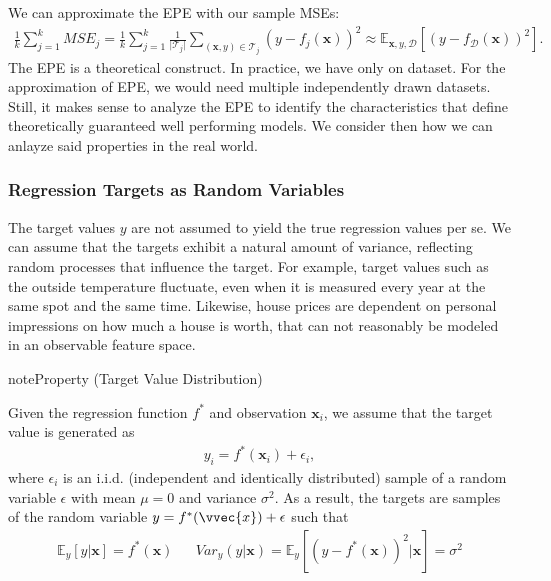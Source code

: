 \documentclass[letterpaper,10pt,english]{jupyterBook}
\begin{document}
\sphinxAtStartPar
We can approximate the EPE with our sample MSEs:
\begin{equation}\label{equation:regression_bias_var:eq:mse_approx}
\begin{split}\frac1k\sum_{j=1}^k MSE_j=\frac1k\sum_{j=1}^k\frac{1}{\lvert\mathcal{T}_j\rvert}\sum_{(\mathbf{x},y)\in\mathcal{T}_j}(y-f_j(\mathbf{x}))^2\approx\mathbb{E}_{\mathbf{x},y,\mathcal{D}}[(y-f_\mathcal{D}(\mathbf{x}))^2].\end{split}
\end{equation}
\sphinxAtStartPar
The EPE is a theoretical construct. In practice, we have only on dataset. For the approximation of EPE, we would need multiple independently drawn datasets. Still, it makes sense to analyze the EPE to identify the characteristics that define theoretically guaranteed well performing models. We consider then how we can anlayze said properties in the real world.


\subsubsection{Regression Targets as Random Variables}
\label{\detokenize{regression_bias_var:regression-targets-as-random-variables}}
\sphinxAtStartPar
The target values \(y\) are not assumed to yield the true regression values per se. We can assume that the targets exhibit a natural amount of variance, reflecting random processes that influence the target. For example, target values such as the outside temperature fluctuate, even when it is measured every year at the same spot and the same time. Likewise, house prices are dependent on personal impressions on how much a house is worth, that can not reasonably be modeled in an observable feature space.
\label{None:prop:target_distr}
\begin{sphinxadmonition}{note}{Property  (Target Value Distribution)}



\sphinxAtStartPar
Given the  regression function \(f^*\) and observation \(\mathbf{x}_i\), we assume that the target value is generated as
\begin{equation*}
\begin{split} y_i = f^*(\mathbf{x}_i)+\epsilon_i,\end{split}
\end{equation*}
where \(\epsilon_i\) is an i.i.d. (independent and identically distributed) sample of a random variable \(\epsilon\) with mean \(\mu=0\) and variance \(\sigma^2\).
As a result, the targets are samples of the random variable \(y=f^*(\vvec{x})+\epsilon\) such that
\begin{align*}
    \mathbb{E}_y[y\vert \mathbf{x}] = f^*(\mathbf{x}) &&
    Var_y(y\vert \mathbf{x}) = \mathbb{E}_y[(y-f^*(\mathbf{x}))^2\vert \mathbf{x}] = \sigma^2
\end{align*}\end{sphinxadmonition}
\end{document}
